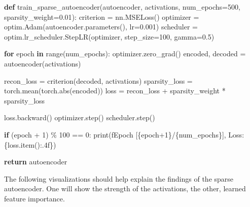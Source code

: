 \documentclass[
  letterpaper,
  DIV=11,
  numbers=noendperiod]{scrreprt}
\newenvironment{Shaded}{\begin{snugshade}}{\end{snugshade}}
\newcommand{\BuiltInTok}[1]{\textcolor[rgb]{0.00,0.23,0.31}{#1}}
\newcommand{\ControlFlowTok}[1]{\textcolor[rgb]{0.00,0.23,0.31}{\textbf{#1}}}
\newcommand{\DecValTok}[1]{\textcolor[rgb]{0.68,0.00,0.00}{#1}}
\newcommand{\FloatTok}[1]{\textcolor[rgb]{0.68,0.00,0.00}{#1}}
\newcommand{\KeywordTok}[1]{\textcolor[rgb]{0.00,0.23,0.31}{\textbf{#1}}}
\newcommand{\NormalTok}[1]{\textcolor[rgb]{0.00,0.23,0.31}{#1}}
\newcommand{\OperatorTok}[1]{\textcolor[rgb]{0.37,0.37,0.37}{#1}}
\newcommand{\SpecialCharTok}[1]{\textcolor[rgb]{0.37,0.37,0.37}{#1}}
\newcommand{\SpecialStringTok}[1]{\textcolor[rgb]{0.13,0.47,0.30}{#1}}
\begin{document}
\begin{Shaded}
\begin{Highlighting}[]
\KeywordTok{def}\NormalTok{ train\_sparse\_autoencoder(autoencoder, activations, num\_epochs}\OperatorTok{=}\DecValTok{500}\NormalTok{, sparsity\_weight}\OperatorTok{=}\FloatTok{0.01}\NormalTok{):}
\NormalTok{    criterion }\OperatorTok{=}\NormalTok{ nn.MSELoss()}
\NormalTok{    optimizer }\OperatorTok{=}\NormalTok{ optim.Adam(autoencoder.parameters(), lr}\OperatorTok{=}\FloatTok{0.001}\NormalTok{)}
\NormalTok{    scheduler }\OperatorTok{=}\NormalTok{ optim.lr\_scheduler.StepLR(optimizer, step\_size}\OperatorTok{=}\DecValTok{100}\NormalTok{, gamma}\OperatorTok{=}\FloatTok{0.5}\NormalTok{)}

    \ControlFlowTok{for}\NormalTok{ epoch }\KeywordTok{in} \BuiltInTok{range}\NormalTok{(num\_epochs):}
\NormalTok{        optimizer.zero\_grad()}
\NormalTok{        encoded, decoded }\OperatorTok{=}\NormalTok{ autoencoder(activations)}

\NormalTok{        recon\_loss }\OperatorTok{=}\NormalTok{ criterion(decoded, activations)}
\NormalTok{        sparsity\_loss }\OperatorTok{=}\NormalTok{ torch.mean(torch.}\BuiltInTok{abs}\NormalTok{(encoded))}
\NormalTok{        loss }\OperatorTok{=}\NormalTok{ recon\_loss }\OperatorTok{+}\NormalTok{ sparsity\_weight }\OperatorTok{*}\NormalTok{ sparsity\_loss}

\NormalTok{        loss.backward()}
\NormalTok{        optimizer.step()}
\NormalTok{        scheduler.step()}

        \ControlFlowTok{if}\NormalTok{ (epoch }\OperatorTok{+} \DecValTok{1}\NormalTok{) }\OperatorTok{\%} \DecValTok{100} \OperatorTok{==} \DecValTok{0}\NormalTok{:}
            \BuiltInTok{print}\NormalTok{(}\SpecialStringTok{f\textquotesingle{}Epoch [}\SpecialCharTok{\{}\NormalTok{epoch}\OperatorTok{+}\DecValTok{1}\SpecialCharTok{\}}\SpecialStringTok{/}\SpecialCharTok{\{}\NormalTok{num\_epochs}\SpecialCharTok{\}}\SpecialStringTok{], Loss: }\SpecialCharTok{\{}\NormalTok{loss}\SpecialCharTok{.}\NormalTok{item()}\SpecialCharTok{:.4f\}}\SpecialStringTok{\textquotesingle{}}\NormalTok{)}

    \ControlFlowTok{return}\NormalTok{ autoencoder}
\end{Highlighting}
\end{Shaded}

The following visualizations should help explain the findings of the
sparse autoencoder. One will show the strength of the activations, the
other, learned feature importance.
\end{document}
